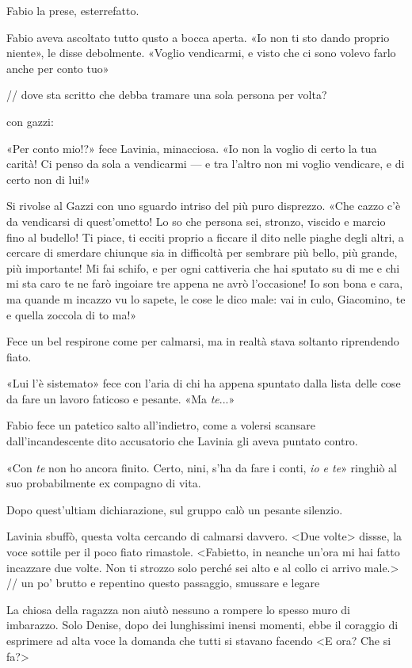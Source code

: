 Fabio la prese, esterrefatto.

Fabio aveva ascoltato tutto qusto a bocca aperta. «Io non ti sto dando proprio niente», le disse debolmente. «Voglio vendicarmi, e visto che ci sono volevo farlo anche per conto tuo»

// dove sta scritto che debba tramare una sola persona per volta?

con gazzi:

«Per conto mio!?» fece Lavinia, minacciosa. «Io non la voglio di certo la tua carità! Ci penso da sola a vendicarmi --- e tra l'altro non mi voglio vendicare, e di certo non di lui!»

Si rivolse al Gazzi con uno sguardo intriso del più puro disprezzo. «Che cazzo c'è da vendicarsi di quest'ometto! Lo so che persona sei, stronzo, viscido e marcio fino al budello! Ti piace, ti ecciti proprio a ficcare il dito nelle piaghe degli altri, a cercare di smerdare chiunque sia in difficoltà per sembrare più bello, più grande, più importante! Mi fai schifo, e per ogni cattiveria che hai sputato su di me e chi mi sta caro te ne farò ingoiare tre appena ne avrò l'occasione! Io son bona e cara, ma quande m incazzo vu lo sapete, le cose le dico male: vai in culo, Giacomino, te e quella zoccola di to ma!»

Fece un bel respirone come per calmarsi, ma in realtà stava soltanto riprendendo fiato.

«Lui l'è sistemato» fece con l'aria di chi ha appena spuntato dalla lista delle cose da fare un lavoro faticoso e pesante. «Ma \emph{te}...»

Fabio fece un patetico salto all'indietro, come a volersi scansare dall'incandescente dito accusatorio che Lavinia gli aveva puntato contro.

«Con \emph{te} non ho ancora finito. Certo, nini, s'ha da fare i conti, \emph{io e te}» ringhiò al suo probabilmente ex compagno di vita.

Dopo quest'ultiam dichiarazione, sul gruppo calò un pesante silenzio.

Lavinia sbuffò, questa volta cercando di calmarsi davvero. <Due volte> dissse, la voce sottile per il poco fiato rimastole. <Fabietto, in neanche un'ora mi hai fatto incazzare due volte. Non ti strozzo solo perché sei alto e al collo ci arrivo male.>
// un po' brutto e repentino questo passaggio, smussare e legare

La chiosa della ragazza non aiutò nessuno a rompere lo spesso muro di imbarazzo. Solo Denise, dopo dei lunghissimi inensi momenti, ebbe il coraggio di esprimere ad alta voce la domanda che tutti si stavano facendo
<E ora? Che si fa?>

